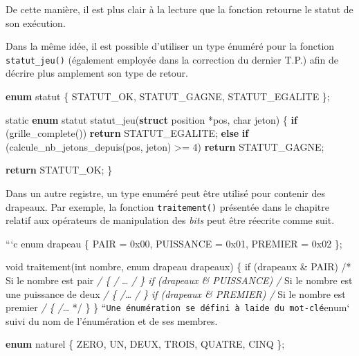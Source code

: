\documentclass[]{article}
\newenvironment{Shaded}{}{}
\newcommand{\KeywordTok}[1]{\textcolor[rgb]{0.00,0.44,0.13}{\textbf{{#1}}}}
\newcommand{\DataTypeTok}[1]{\textcolor[rgb]{0.56,0.13,0.00}{{#1}}}
\newcommand{\DecValTok}[1]{\textcolor[rgb]{0.25,0.63,0.44}{{#1}}}
\newcommand{\ControlFlowTok}[1]{\textcolor[rgb]{0.00,0.44,0.13}{\textbf{{#1}}}}
\newcommand{\NormalTok}[1]{{#1}}
\begin{document}
De cette manière, il est plus clair à la lecture que la fonction
retourne le statut de son exécution.

Dans la même idée, il est possible d'utiliser un type énuméré pour la
fonction \texttt{statut\_jeu()} (également employée dans la correction
du dernier T.P.) afin de décrire plus amplement son type de retour.

\begin{Shaded}
\begin{Highlighting}[]
\KeywordTok{enum} \NormalTok{statut \{ STATUT_OK, STATUT_GAGNE, STATUT_EGALITE \};}


\DataTypeTok{static} \KeywordTok{enum} \NormalTok{statut statut_jeu(}\KeywordTok{struct} \NormalTok{position *pos, }\DataTypeTok{char} \NormalTok{jeton)}
\NormalTok{\{}
    \ControlFlowTok{if} \NormalTok{(grille_complete())}
        \ControlFlowTok{return} \NormalTok{STATUT_EGALITE;}
    \ControlFlowTok{else} \ControlFlowTok{if} \NormalTok{(calcule_nb_jetons_depuis(pos, jeton) >= }\DecValTok{4}\NormalTok{)}
        \ControlFlowTok{return} \NormalTok{STATUT_GAGNE;}

    \ControlFlowTok{return} \NormalTok{STATUT_OK;}
\NormalTok{\}}
\end{Highlighting}
\end{Shaded}

Dans un autre registre, un type enuméré peut être utilisé pour contenir
des drapeaux. Par exemple, la fonction \texttt{traitement()} présentée
dans le chapitre relatif aux opérateurs de manipulation des \emph{bits}
peut être réecrite comme suit.

```c enum drapeau \{ PAIR = 0x00, PUISSANCE = 0x01, PREMIER = 0x02 \};

void traitement(int nombre, enum drapeau drapeaux) \{ if (drapeaux \&
PAIR) /* Si le nombre est pair \emph{/ \{ /} \ldots{} \emph{/ \} if
(drapeaux \& PUISSANCE) /} Si le nombre est une puissance de deux
\emph{/ \{ /}\ldots{} \emph{/ \} if (drapeaux \& PREMIER) /} Si le
nombre est premier \emph{/ \{ /}\ldots{} */ \} \}
``\texttt{Une\ énumération\ se\ défini\ à\ l\textquotesingle{}aide\ du\ mot-clé}enum`
suivi du nom de l'énumération et de ses membres.

\begin{Shaded}
\begin{Highlighting}[]
\KeywordTok{enum} \NormalTok{naturel \{ ZERO, UN, DEUX, TROIS, QUATRE, CINQ \};}
\end{Highlighting}
\end{Shaded}
\end{document}
